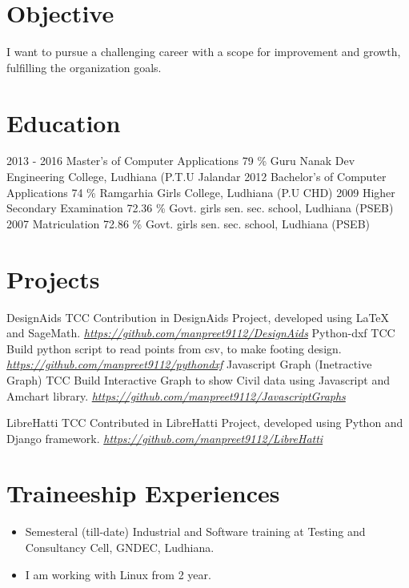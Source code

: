 \documentclass[]{friggeri-cv}
\begin{document}
\section{Objective}
I want to pursue a challenging career with a scope for improvement and
growth, fulfilling the organization goals.
\section{Education}
\begin{entrylist}
  \entry
    {2013 - 2016}
    {Master's of Computer Applications}
    {79 \%}
    {Guru Nanak Dev Engineering College, Ludhiana (P.T.U Jalandar}
  \entry
    {2012}
    {Bachelor's of Computer Applications}
    {74 \%}
    {Ramgarhia Girls College, Ludhiana (P.U CHD)}
  \entry
    {2009}
    {Higher Secondary Examination}
    {72.36 \%}
    {Govt. girls sen. sec. school,
Ludhiana (PSEB)}
    \entry
    {2007}
    {Matriculation}
    {72.86 \%}
    {Govt. girls sen. sec. school,
Ludhiana (PSEB)}
\end{entrylist}

\section{Projects}
\begin{entrylist}
   \entry
    {}
    {DesignAids}
    {TCC}
    {
       Contribution in DesignAids Project, developed using LaTeX and
SageMath.  
        \textit{\href{https://github.com/manpreet9112/DesignAids}{https://github.com/manpreet9112/DesignAids}}
    }
  \entry
    {}
    {Python-dxf}
    {TCC}
    {
      Build python script to read points from csv, to make footing
design.  
        \textit{\href{https://github.com/manpreet9112/pythondxf}{https://github.com/manpreet9112/pythondxf}}
    }
    \entry
    {}
    {Javascript Graph (Inetractive Graph)}
    {TCC}
    {
       Build Interactive Graph to show Civil data using Javascript and
Amchart library.
        \textit{\href{https://github.com/manpreet9112/JavascriptGraphs}{https://github.com/manpreet9112/JavascriptGraphs}}
    }

  \entry
    {}
    {LibreHatti}
    {TCC}
    {
       Contributed in LibreHatti Project, developed using Python and
Django framework.
        \textit{\href{https://github.com/manpreet9112/LibreHatti}{https://github.com/manpreet9112/LibreHatti}} 
    }
\end{entrylist}
\section{Traineeship Experiences}
\begin{itemize}
\item Semesteral (till-date) Industrial and Software training at Testing
and Consultancy Cell, GNDEC,
Ludhiana.
\item I am working with Linux from 2 year.
\end{itemize}
\end{document}
